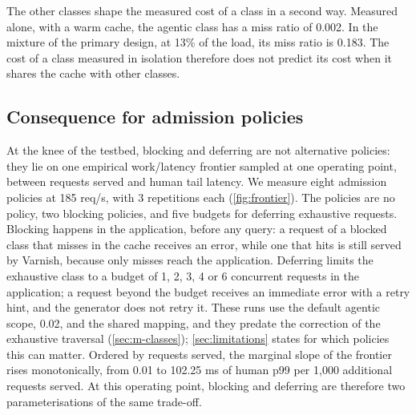 The other classes shape the measured cost of a class in a second way.
Measured alone, with a warm cache, the agentic class has a miss ratio of 0.002.
In the mixture of the primary design, at 13\% of the load, its miss ratio is
0.183.
The cost of a class measured in isolation therefore does not predict its cost when it
shares the cache with other classes.

\subsection{Consequence for admission policies}\label{sec:r-frontier}
At the knee of the testbed, blocking and deferring are not alternative policies: they
lie on one empirical work/latency frontier sampled at one operating point, between
requests served and human tail latency.
We measure eight admission policies at 185 req/s, with 3 repetitions each
(\cref{fig:frontier}).
The policies are no policy, two blocking policies, and five budgets for deferring
exhaustive requests.
Blocking happens in the application, before any query: a request of a blocked class that
misses in the cache receives an error, while one that hits is still served by Varnish,
because only misses reach the application.
Deferring limits the exhaustive class to a budget of 1, 2, 3, 4 or 6 concurrent requests
in the application; a request beyond the budget receives an immediate error with a retry
hint, and the generator does not retry it.
These runs use the default agentic scope, 0.02, and the shared mapping, and they predate
the correction of the exhaustive traversal (\cref{sec:m-classes}); \cref{sec:limitations}
states for which policies this can matter.
Ordered by requests served, the marginal slope of the frontier rises monotonically, from
0.01 to 102.25 ms of human p99 per 1,000 additional requests served.
At this operating point, blocking and deferring are therefore two parameterisations of
the same trade-off.


